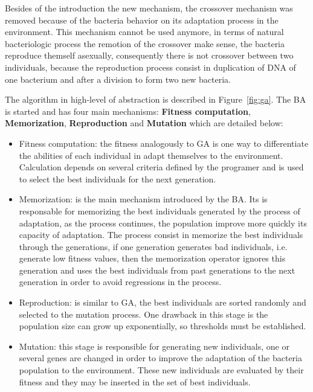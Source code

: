 Besides of the introduction the new mechanism, the crossover mechanism was
removed because of the bacteria behavior on its adaptation process in the
environment. This mechanism cannot be used anymore, in terms of natural bacteriologic
process the remotion of the crossover make sense, the bacteria reproduce themself
asexually, consequently there is not crossover between two individuals, because
the reproduction process consist in duplication of DNA of one bacterium and after
a division to form two new bacteria.

The algorithm in high-level of abstraction is described in Figure~\ref{fig:ga}.
The BA is started and has four main mechanisms: {\bf Fitness computation}, {\bf Memorization},
{\bf Reproduction} and {\bf Mutation} which are detailed below:

\begin{itemize}
	\item Fitness computation: the fitness analogously to GA is one way to 	
	differentiate the abilities of each individual in adapt themselves to the
	environment. Calculation depends on several criteria defined by 
	the programer and is used to select the best individuals for the next generation.

	\item Memorization: is the main mechanism introduced by the BA. Its is responsable
	for memorizing the best individuals generated by the process of adaptation,
	as the process continues, the population improve more quickly its capacity of
	adaptation. The process consist in memorize the best individuals through 
	the	generations, if one generation generates bad individuals, i.e. generate low
	fitness values, then the memorization operator ignores this generation and
	uses the best individuals from past generations to the next generation in order
	to avoid regressions in the process.

	\item Reproduction: is similar to GA, the best individuals are sorted randomly
	and selected to the mutation process. One drawback in this stage is the population
    size can grow up exponentially, so thresholds must be established.

	\item Mutation: this stage is responsible for generating new individuals, one
	or several genes are changed in order to improve the adaptation of the bacteria
	population to the environment. These new individuals are evaluated by their
	fitness and they may be inserted in the set of best	individuals.

\end{itemize}

